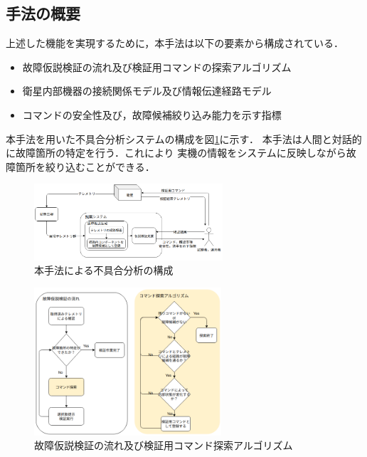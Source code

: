 \documentclass[11pt]{jsarticle}%
\begin{document}
\begin{multicols}{2}
\subsection{手法の概要}
\vspace{-1zh}
上述した機能を実現するために，本手法は以下の要素から構成されている．
\begin{itemize} %
  \item 故障仮説検証の流れ及び検証用コマンドの探索アルゴリズム%
  \item 衛星内部機器の接続関係モデル及び情報伝達経路モデル
  \item コマンドの安全性及び，故障候補絞り込み能力を示す指標
\end{itemize}
本手法を用いた不具合分析システムの構成を図\ref{fig:whole_flow}に示す．
本手法は人間と対話的に故障箇所の特定を行う．これにより %
実機の情報をシステムに反映しながら故障箇所を絞り込むことができる．
\begin{figure}[H]
  \centering
    \includegraphics[width=7.0cm]{../figure/whole_flow.png}
    \caption{本手法による不具合分析の構成}
    \label{fig:whole_flow}
\end{figure}
\vspace{-1zh}
\begin{figure}[H]
  \centering
    \includegraphics[height=5.5cm]{../figure/COM_search_algorithm.png}
    \caption{故障仮説検証の流れ及び検証用コマンド探索アルゴリズム}%
    \label{fig:algorithm}
\end{figure}
\vspace{-2zh}

\end{multicols}
\end{document}
